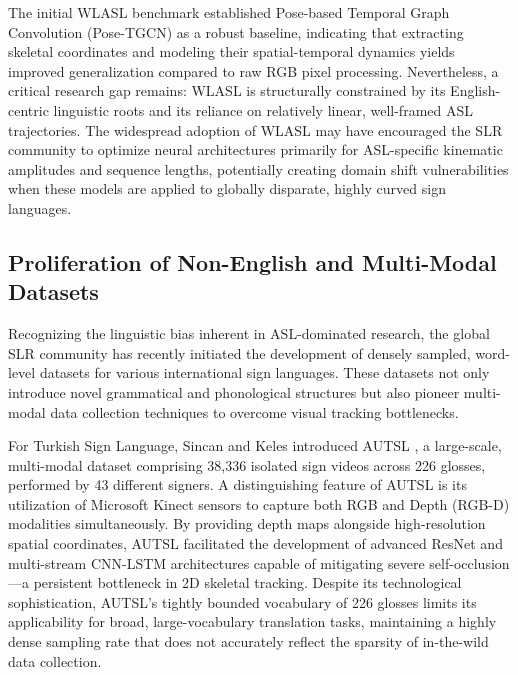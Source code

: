 \documentclass{ieeeaccess}
\begin{document}
The initial WLASL benchmark established Pose-based Temporal Graph Convolution (Pose-TGCN) as a robust baseline, indicating that extracting skeletal coordinates and modeling their spatial-temporal dynamics yields improved generalization compared to raw RGB pixel processing. Nevertheless, a critical research gap remains: WLASL is structurally constrained by its English-centric linguistic roots and its reliance on relatively linear, well-framed ASL trajectories. The widespread adoption of WLASL may have encouraged the SLR community to optimize neural architectures primarily for ASL-specific kinematic amplitudes and sequence lengths, potentially creating domain shift vulnerabilities when these models are applied to globally disparate, highly curved sign languages.

\subsection{Proliferation of Non-English and Multi-Modal Datasets}
Recognizing the linguistic bias inherent in ASL-dominated research, the global SLR community has recently initiated the development of densely sampled, word-level datasets for various international sign languages. These datasets not only introduce novel grammatical and phonological structures but also pioneer multi-modal data collection techniques to overcome visual tracking bottlenecks. 

For Turkish Sign Language, Sincan and Keles introduced AUTSL \cite{sincan2020autsl}, a large-scale, multi-modal dataset comprising 38,336 isolated sign videos across 226 glosses, performed by 43 different signers. A distinguishing feature of AUTSL is its utilization of Microsoft Kinect sensors to capture both RGB and Depth (RGB-D) modalities simultaneously. By providing depth maps alongside high-resolution spatial coordinates, AUTSL facilitated the development of advanced ResNet \cite{he2016deep} and multi-stream CNN-LSTM architectures capable of mitigating severe self-occlusion—a persistent bottleneck in 2D skeletal tracking. Despite its technological sophistication, AUTSL's tightly bounded vocabulary of 226 glosses limits its applicability for broad, large-vocabulary translation tasks, maintaining a highly dense sampling rate that does not accurately reflect the sparsity of in-the-wild data collection.
\end{document}
